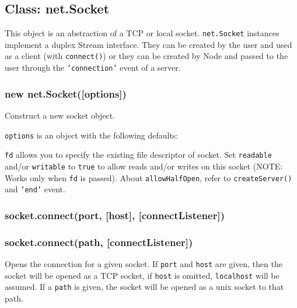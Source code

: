 \subsection{Class: net.Socket}\label{class-net.socket}

This object is an abstraction of a TCP or local socket.
\texttt{net.Socket} instances implement a duplex Stream interface. They
can be created by the user and used as a client (with
\texttt{connect()}) or they can be created by Node and passed to the
user through the \texttt{'connection'} event of a server.

\subsubsection{new
net.Socket({[}options{]})}\label{new-net.socketoptions}

Construct a new socket object.

\texttt{options} is an object with the following defaults:

\begin{Shaded}
\begin{Highlighting}[]
\NormalTok{\{ }\NormalTok{: }
  \NormalTok{: }\NormalTok{,}
  \NormalTok{: }\NormalTok{,}
  \NormalTok{: }
\NormalTok{\}}
\end{Highlighting}
\end{Shaded}

\texttt{fd} allows you to specify the existing file descriptor of
socket. Set \texttt{readable} and/or \texttt{writable} to \texttt{true}
to allow reads and/or writes on this socket (NOTE: Works only when
\texttt{fd} is passed). About \texttt{allowHalfOpen}, refer to
\texttt{createServer()} and \texttt{'end'} event.

\subsubsection{socket.connect(port, {[}host{]},
{[}connectListener{]})}\label{socket.connectport-host-connectlistener}

\subsubsection{socket.connect(path,
{[}connectListener{]})}\label{socket.connectpath-connectlistener}

Opens the connection for a given socket. If \texttt{port} and
\texttt{host} are given, then the socket will be opened as a TCP socket,
if \texttt{host} is omitted, \texttt{localhost} will be assumed. If a
\texttt{path} is given, the socket will be opened as a unix socket to
that path.

